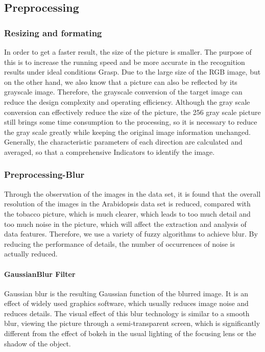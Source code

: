 \documentclass[conference]{IEEEtran}
\begin{document}
\subsection{Preprocessing}
\subsubsection{Resizing and formating}
In order to get a faster result, the size of the picture is smaller. The purpose of this is to increase the running speed and be more accurate in the recognition results under ideal conditions Grasp. Due to the large size of the RGB image, but on the other hand, we also know that a picture can also be reflected by its grayscale image. Therefore, the grayscale conversion of the target image can reduce the design complexity and operating efficiency. Although the gray scale conversion can effectively reduce the size of the picture, the 256 gray scale picture still brings some time consumption to the processing, so it is necessary to reduce the gray scale greatly while keeping the original image information unchanged. Generally, the characteristic parameters of each direction are calculated and averaged, so that a comprehensive Indicators to identify the image.


\subsubsection{Preprocessing-Blur}
 Through the observation of the images in the data set, it is found that the overall resolution of the images in the Arabidopsis data set is reduced, compared with the tobacco picture, which is much clearer, which leads to too much detail and too much noise in the picture, which will affect the extraction and analysis of data features. Therefore, we use a variety of fuzzy algorithms to achieve blur. By reducing the performance of details, the number of occurrences of noise is actually reduced.
\paragraph{GaussianBlur Filter}
Gaussian blur is the resulting Gaussian function of the blurred image. It is an effect of widely used graphics software, which usually reduces image noise and reduces details. The visual effect of this blur technology is similar to a smooth blur, viewing the picture through a semi-transparent screen, which is significantly different from the effect of bokeh in the usual lighting of the focusing lens or the shadow of the object. 
\end{document}
